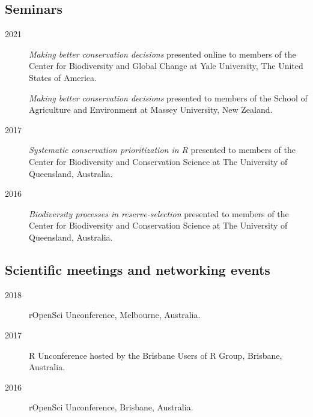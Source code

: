 \documentclass[12pt,a4paper]{article}
\begin{document}
\subsection*{Seminars}
\begin{description}

\item[2021] \textit{Making better conservation decisions} presented online to members of the Center for Biodiversity and Global Change at Yale University, The United States of America.

\item[] \textit{Making better conservation decisions} presented to members of the School of Agriculture and Environment at Massey University, New Zealand.

\item[2017] \textit{Systematic conservation prioritization in R} presented to members of the Center for Biodiversity and Conservation Science at The University of Queensland, Australia.

\item[2016] \textit{Biodiversity processes in reserve-selection} presented to members of the Center for Biodiversity and Conservation Science at The University of Queensland, Australia.

\end{description}

\subsection*{Scientific meetings and networking events}
\begin{description}

\item[2018] rOpenSci Unconference, Melbourne, Australia.

\item[2017] R Unconference hosted by the Brisbane Users of R Group, Brisbane, Australia.

\item[2016] rOpenSci Unconference, Brisbane, Australia.
\end{description}
\end{document}
